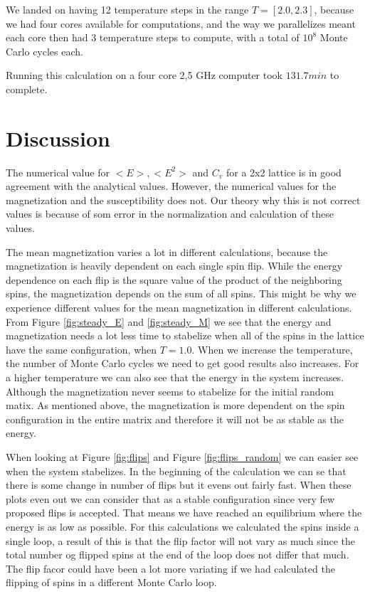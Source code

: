 \documentclass{article}
\begin{document}
{{		We landed on having 12 temperature steps in the range $T = [2.0, 2.3]$, because we had four cores available for computations, and the way we parallelizes meant each core then had 3 temperature steps to compute, with a total of $10^8$ Monte Carlo cycles each.



		Running this calculation on a four core 2,5 GHz computer took $131.7 min$ to complete.

\newpage
\section{Discussion}


	The numerical value for $<E>, <E^2>$ and $C_v$ for a 2x2 lattice is in good agreement with the analytical values. However, the numerical values for the magnetization and the susceptibility does not. Our theory why this is not correct values is because of som error in the normalization and calculation of these values.

	The mean magnetization varies a lot in different calculations, because the magnetization is heavily dependent on each single spin flip. While the energy dependence on each flip is the square value of the product of the neighboring spins, the magnetization depends on the sum of all spins. This might be why we experience different values for the mean magnetization in different calculations.\\

	From Figure \ref{fig:steady_E} and \ref{fig:steady_M} we see that the energy and magnetization needs a lot less time to stabelize when all of the spins in the lattice have the same configuration, when $T = 1.0$. When we increase the temperature, the number of Monte Carlo cycles we need to get good results also increases. For a higher temperature we can also see that the energy in the system increases. Although the magnetization never seems to stabelize for the initial random matix. As mentioned above, the magnetization is more dependent on the spin configuration in the entire matrix and therefore it will not be as stable as the energy.


	 When looking at Figure \ref{fig:flips} and Figure \ref{fig:flips_random} we can easier see when the system stabelizes. In the beginning of the calculation we can se that there is some change in number of flips but it evens out fairly fast. When these plots even out we can consider that as a stable configuration since very few proposed flips is accepted. That means we have reached an equilibrium where the energy is as low as possible. For this calculations we calculated the spins inside a single loop, a result of this is that the flip factor will not vary as much since the total number og flipped spins at the end of the loop does not differ that much. The flip facor could have been a lot more variating if we had calculated the flipping of spins in a different Monte Carlo loop.


}}
\end{document}
